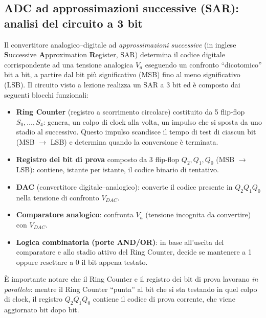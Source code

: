 \documentclass[11pt,a4paper]{report}
\begin{document}

\subsection{ADC ad approssimazioni successive (SAR): analisi del circuito a 3 bit}

Il convertitore analogico--digitale ad \emph{approssimazioni successive} (in inglese \textbf{S}uccessive \textbf{A}pproximation \textbf{R}egister, SAR) determina il codice digitale corrispondente ad una tensione analogica $V_a$ eseguendo un confronto ``dicotomico'' bit a bit, a partire dal bit più significativo (MSB) fino al meno significativo (LSB). Il circuito visto a lezione realizza un SAR a 3 bit ed è composto dai seguenti blocchi funzionali:

\begin{itemize}
    \item \textbf{Ring Counter} (registro a scorrimento circolare) costituito da 5 flip-flop $S_0,\dots,S_4$: genera, un colpo di clock alla volta, un impulso che si sposta da uno stadio al successivo. Questo impulso scandisce il tempo di test di ciascun bit (MSB $\to$ LSB) e determina quando la conversione è terminata.
    \item \textbf{Registro dei bit di prova} composto da 3 flip-flop $Q_2, Q_1, Q_0$ (MSB $\to$ LSB): contiene, istante per istante, il codice binario di tentativo.
    \item \textbf{DAC} (convertitore digitale--analogico): converte il codice presente in $Q_2Q_1Q_0$ nella tensione di confronto $V_{DAC}$.
    \item \textbf{Comparatore analogico}: confronta $V_a$ (tensione incognita da convertire) con $V_{DAC}$.
    \item \textbf{Logica combinatoria (porte AND/OR)}: in base all'uscita del comparatore e allo stadio attivo del Ring Counter, decide se mantenere a 1 oppure resettare a 0 il bit appena testato.
\end{itemize}

\`E importante notare che il Ring Counter e il registro dei bit di prova lavorano \emph{in parallelo}: mentre il Ring Counter ``punta'' al bit che si sta testando in quel colpo di clock, il registro $Q_2Q_1Q_0$ contiene il codice di prova corrente, che viene aggiornato bit dopo bit.
\end{document}
